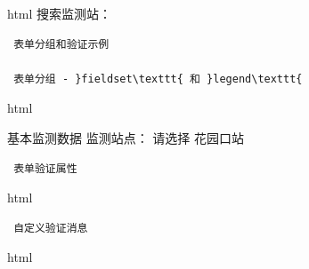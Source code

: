 html 搜索监测站：

\begin{lstlisting}
 表单分组和验证示例

 表单分组 - }fieldset\texttt{ 和 }legend\texttt{
\end{lstlisting}

html

基本监测数据 监测站点： 请选择 花园口站

\begin{lstlisting}
 表单验证属性
\end{lstlisting}

html

\begin{lstlisting}
 自定义验证消息
\end{lstlisting}

html

